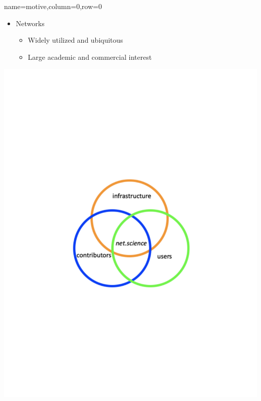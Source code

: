 \documentclass[landscape,paperwidth=70in,paperheight=46in,fontscale=0.225]{baposter} %
\begin{document}
\begin{poster}
            

\vspace{-2.5in} %


          {name=motive,column=0,row=0}{
{\small
\begin{minipage}{.73\textwidth}
\begin{itemize}[leftmargin=*,noitemsep,topsep=0pt]
\item Networks
	\begin{itemize}
	\item Widely utilized and ubiquitous
	\item Large academic and commercial interest
	\end{itemize}
\end{itemize}
 \end{minipage}       
\begin{minipage}{.22\textwidth}
\includegraphics[scale=0.23]{figures/motivation.pdf}
\end{minipage}

}}
\end{poster}
\end{document}
